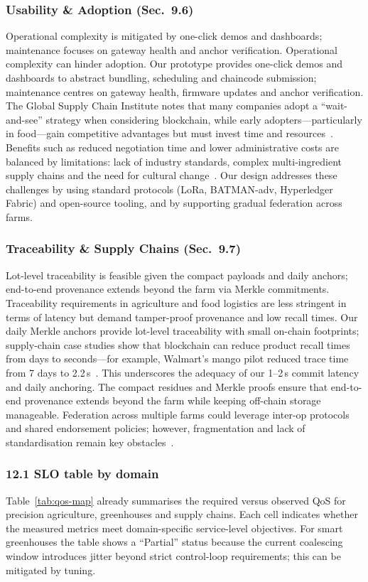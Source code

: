 \documentclass[12pt,onecolumn]{IEEEtran} %
\begin{document}
\subsubsection{Usability \& Adoption (Sec.~9.6)}
Operational complexity is mitigated by one-click demos and dashboards; maintenance focuses on gateway health and anchor verification. Operational complexity can hinder adoption. Our prototype provides one-click demos and dashboards to abstract bundling, scheduling and chaincode submission; maintenance centres on gateway health, firmware updates and anchor verification. The Global Supply Chain Institute notes that many companies adopt a “wait-and-see” strategy when considering blockchain, while early adopters—particularly in food—gain competitive advantages but must invest time and resources~\cite{ref167328542643761}. Benefits such as reduced negotiation time and lower administrative costs are balanced by limitations: lack of industry standards, complex multi-ingredient supply chains and the need for cultural change~\cite{ref167328542643761}. Our design addresses these challenges by using standard protocols (LoRa, BATMAN-adv, Hyperledger Fabric) and open-source tooling, and by supporting gradual federation across farms.

\subsubsection{Traceability \& Supply Chains (Sec.~9.7)}
Lot-level traceability is feasible given the compact payloads and daily anchors; end-to-end provenance extends beyond the farm via Merkle commitments. Traceability requirements in agriculture and food logistics are less stringent in terms of latency but demand tamper-proof provenance and low recall times. Our daily Merkle anchors provide lot-level traceability with small on-chain footprints; supply-chain case studies show that blockchain can reduce product recall times from days to seconds—for example, Walmart’s mango pilot reduced trace time from 7 days to 2.2\,s~\cite{ref510439910314487}. This underscores the adequacy of our 1–2\,s commit latency and daily anchoring. The compact residues and Merkle proofs ensure that end-to-end provenance extends beyond the farm while keeping off-chain storage manageable. Federation across multiple farms could leverage inter-op protocols and shared endorsement policies; however, fragmentation and lack of standardisation remain key obstacles~\cite{ref167328542643761}.

\subsubsection*{12.1 SLO table by domain}
Table~\ref{tab:qos-map} already summarises the required versus observed QoS for precision agriculture, greenhouses and supply chains. Each cell indicates whether the measured metrics meet domain-specific service-level objectives. For smart greenhouses the table shows a ``Partial'' status because the current coalescing window introduces jitter beyond strict control-loop requirements; this can be mitigated by tuning.
\end{document}
